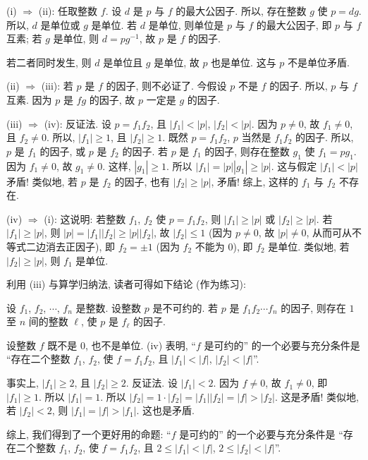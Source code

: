\begin{pf}
    (i) $\Rightarrow$ (ii): 任取整数 $f$. 设 $d$ 是 $p$ 与 $f$ 的最大公因子. 所以, 存在整数 $g$ 使 $p = dg$. 所以, $d$ 是单位或 $g$ 是单位. 若 $d$ 是单位, 则单位是 $p$ 与 $f$ 的最大公因子, 即 $p$ 与 $f$ 互素; 若 $g$ 是单位, 则 $d = p g^{-1}$, 故 $p$ 是 $f$ 的因子.

    若二者同时发生, 则 $d$ 是单位且 $g$ 是单位, 故 $p$ 也是单位. 这与 $p$ 不是单位矛盾.

    (ii) $\Rightarrow$ (iii): 若 $p$ 是 $f$ 的因子, 则不必证了. 今假设 $p$ 不是 $f$ 的因子. 所以, $p$ 与 $f$ 互素. 因为 $p$ 是 $fg$ 的因子, 故 $p$ 一定是 $g$ 的因子.

    (iii) $\Rightarrow$ (iv): 反证法. 设 $p = f_1 f_2$, 且 $|f_1| < |p|$, $|f_2| < |p|$. 因为 $p \neq 0$, 故 $f_1 \neq 0$, 且 $f_2 \neq 0$. 所以, $|f_1| \geq 1$, 且 $|f_2| \geq 1$. 既然 $p = f_1 f_2$, $p$ 当然是 $f_1 f_2$ 的因子. 所以, $p$ 是 $f_1$ 的因子, 或 $p$ 是 $f_2$ 的因子. 若 $p$ 是 $f_1$ 的因子, 则存在整数 $g_1$ 使 $f_1 = pg_1$. 因为 $f_1 \neq 0$, 故 $g_1 \neq 0$. 这样, $|g_1| \geq 1$. 所以 $|f_1| = |p| |g_1| \geq |p|$. 这与假定 $|f_1| < |p|$ 矛盾! 类似地, 若 $p$ 是 $f_2$ 的因子, 也有 $|f_2| \geq |p|$, 矛盾! 综上, 这样的 $f_1$ 与 $f_2$ 不存在.

    (iv) $\Rightarrow$ (i): 这说明: 若整数 $f_1$, $f_2$ 使 $p = f_1 f_2$, 则 $|f_1| \geq |p|$ 或 $|f_2| \geq |p|$. 若 $|f_1| \geq |p|$, 则 $|p| = |f_1| |f_2| \geq |p| |f_2|$, 故 $|f_2| \leq 1$ (因为 $p \neq 0$, 故 $|p| \neq 0$, 从而可从不等式二边消去正因子), 即 $f_2 = \pm 1$ (因为 $f_2$ 不能为 $0$), 即 $f_2$ 是单位. 类似地, 若 $|f_2| \geq |p|$, 则 $f_1$ 是单位.
\end{pf}

\begin{remark}
    利用 (iii) 与算学归纳法, 读者可得如下结论 (作为练习):

    设 $f_1$, $f_2$, $\cdots$, $f_n$ 是整数. 设整数 $p$ 是不可约的. 若 $p$ 是 $f_1 f_2 \cdots f_n$ 的因子, 则存在 $1$ 至 $n$ 间的整数 $\ell$, 使 $p$ 是 $f_{\ell}$ 的因子.
\end{remark}

\begin{remark}
    设整数 $f$ 既不是 $0$, 也不是单位. (iv) 表明, ``$f$ 是可约的'' 的一个必要与充分条件是 ``存在二个整数 $f_1$, $f_2$, 使 $f = f_1 f_2$, 且 $|f_1| < |f|$, $|f_2| < |f|$''.

    事实上, $|f_1| \geq 2$, 且 $|f_2| \geq 2$. 反证法. 设 $|f_1| < 2$. 因为 $f \neq 0$, 故 $f_1 \neq 0$, 即 $|f_1| \geq 1$. 所以 $|f_1| = 1$. 所以 $|f_2| = 1 \cdot |f_2| = |f_1| |f_2| = |f| > |f_2|$. 这是矛盾! 类似地, 若 $|f_2| < 2$, 则 $|f_1| = |f| > |f_1|$. 这也是矛盾.

    综上, 我们得到了一个更好用的命题: ``$f$ 是可约的'' 的一个必要与充分条件是 ``存在二个整数 $f_1$, $f_2$, 使 $f = f_1 f_2$, 且 $2 \leq |f_1| < |f|$, $2 \leq |f_2| < |f|$''.
\end{remark}

